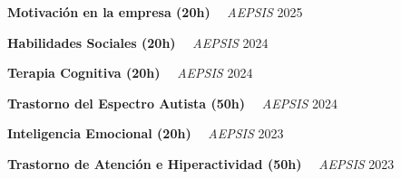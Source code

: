 \documentclass[letterpaper,11pt]{article}
\begin{document}
    \par 
    \vspace{0.1cm} 
    \noindent
    \begin{minipage}[t]{1.0\linewidth}
        {\textbf{Motivación en la empresa (20h)}} 
        \ \textendash \ 
        {\color{detailgray}\textit{AEPSIS}}
        \hfill 
        {\small 2025}
    \end{minipage}
    \par 
    \vspace{0.1cm} 
    \noindent
    \begin{minipage}[t]{1.0\linewidth}
        {\textbf{Habilidades Sociales (20h)}} 
        \ \textendash \ 
        {\color{detailgray}\textit{AEPSIS}}
        \hfill 
        {\small 2024}
    \end{minipage}
    \par 
    \vspace{0.1cm} 
    \noindent
    \begin{minipage}[t]{1.0\linewidth}
        {\textbf{Terapia Cognitiva (20h)}} 
        \ \textendash \ 
        {\color{detailgray}\textit{AEPSIS}}
        \hfill 
        {\small 2024}
    \end{minipage}
    \par 
    \vspace{0.1cm} 
    \noindent
    \begin{minipage}[t]{1.0\linewidth}
        {\textbf{Trastorno del Espectro Autista (50h)}} 
        \ \textendash \ 
        {\color{detailgray}\textit{AEPSIS}}
        \hfill 
        {\small 2024}
    \end{minipage}
    \par 
    \vspace{0.1cm} 
    \noindent
    \begin{minipage}[t]{1.0\linewidth}
        {\textbf{Inteligencia Emocional (20h)}} 
        \ \textendash \ 
        {\color{detailgray}\textit{AEPSIS}}
        \hfill 
        {\small 2023}
    \end{minipage}
    \par 
    \vspace{0.1cm} 
    \noindent
    \begin{minipage}[t]{1.0\linewidth}
        {\textbf{Trastorno de Atención e Hiperactividad (50h)}} 
        \ \textendash \ 
        {\color{detailgray}\textit{AEPSIS}}
        \hfill 
        {\small 2023}
    \end{minipage}
\end{document}
